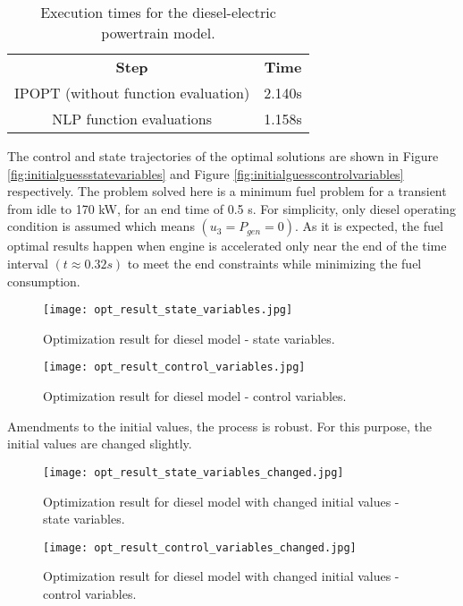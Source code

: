 \begin{table}
\begin{center}
	\caption{Execution times for the diesel-electric powertrain model.} 
	\label{tab:table1} 
	\begin{tabular}{ cc } 
		\hline
		\bfseries Step & \bfseries Time  \\ 
		IPOPT (without function evaluation) & 2.140s \\ 
		NLP function evaluations & 1.158s \\ 
		\hline
	\end{tabular}
\end{center}
\end{table}

The control and state trajectories of the optimal solutions are shown in Figure \ref{fig:initialguessstatevariables} and Figure \ref{fig:initialguesscontrolvariables} respectively. The problem solved here is a minimum fuel problem for a transient 
from idle to 170 kW, for an end time of 0.5 s. For simplicity, only diesel operating condition is assumed which
means $(u_3=P_{gen} = 0)$. As it is expected, the fuel optimal results happen when engine is accelerated only near the
end of the time interval $(t\approx 0.32 s)$ to meet the end constraints while minimizing the fuel consumption.

\begin{figure}
	\texttt{[image: opt\_result\_state\_variables.jpg]}
	\caption{Optimization result for diesel model - state variables.}
	\label{fig:optimizationresultstatevariables}
\end{figure}

\begin{figure}
	\texttt{[image: opt\_result\_control\_variables.jpg]}
	\caption{Optimization result for diesel model - control variables.}
	\label{fig:optimizationresultcontrolvariables}
\end{figure}

Amendments to the initial values, the process is robust. For this purpose, the initial values are changed slightly.

\begin{figure}
	\texttt{[image: opt\_result\_state\_variables\_changed.jpg]}
	\caption{Optimization result for diesel model with changed initial values - state variables.}
	\label{fig:optimizationresultchangedstatevariables}
\end{figure}

\begin{figure}
	\texttt{[image: opt\_result\_control\_variables\_changed.jpg]}
	\caption{Optimization result for diesel model with changed initial values - control variables.}
	\label{fig:optimizationresultchangedcontrolvariables}
\end{figure}

